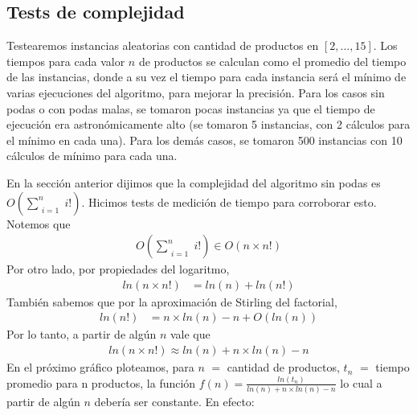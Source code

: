 \subsection{Tests de complejidad}
Testearemos instancias aleatorias con cantidad de productos en $[2,...,15]$. Los tiempos para cada valor $n$ de productos se calculan como el promedio del tiempo de las instancias, donde a su vez el tiempo para cada instancia será el mínimo de varias ejecuciones del algoritmo, para mejorar la precisión. Para los casos sin podas o con podas malas, se tomaron pocas instancias ya que el tiempo de ejecución era astronómicamente alto (se tomaron 5 instancias, con 2 cálculos para el mínimo en cada una). Para los demás casos, se tomaron 500 instancias con 10 cálculos de mínimo para cada una.

En la sección anterior dijimos que la complejidad del algoritmo sin podas es $O\left(\sum\limits_{\substack{i = 1}}^n i!\right)$. Hicimos tests de medición de tiempo para corroborar esto. Notemos que 
\begin{align*}
O\left(\sum\limits_{\substack{i = 1}}^n i!\right) \in O(n \times n!)
\end{align*}
Por otro lado, por propiedades del logaritmo, 
\begin{align*}
ln(n \times n!) &= ln(n) + ln(n!)
\end{align*}
También sabemos que por la aproximación de Stirling del factorial, 
\begin{align*}
ln(n!) &= n \times ln(n) - n + O(ln(n))
\end{align*}
Por lo tanto, a partir de algún $n$ vale que 
\begin{align*}
ln(n \times n!) \approx ln(n) + n \times ln(n) - n
\end{align*}
En el próximo gráfico ploteamos, para $n$ $=$ cantidad de productos, $t_n$ $=$ tiempo promedio para n productos, la función $f(n) = \frac{ln(t_n)}{ln(n) + n \times ln(n) - n}$ lo cual a partir de algún $n$ debería ser constante. En efecto:

